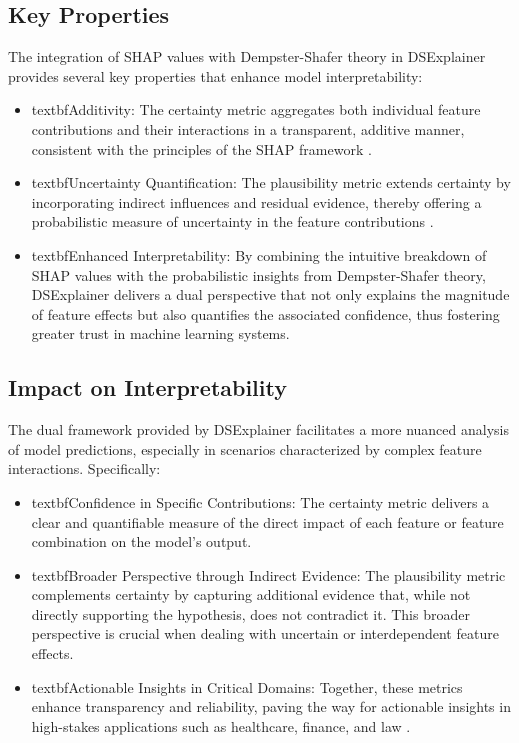 \documentclass[acmlarge]{acmart}
\begin{document}
\subsection{Key Properties}

The integration of SHAP values with Dempster-Shafer theory in DSExplainer provides several key properties that enhance model interpretability:

\begin{itemize}
    \item textbf{Additivity:} The certainty metric aggregates both individual feature contributions and their interactions in a transparent, additive manner, consistent with the principles of the SHAP framework \cite{shapley1953value}.
    \item textbf{Uncertainty Quantification:} The plausibility metric extends certainty by incorporating indirect influences and residual evidence, thereby offering a probabilistic measure of uncertainty in the feature contributions \cite{shafer1976mathematical}.
    \item textbf{Enhanced Interpretability:} By combining the intuitive breakdown of SHAP values with the probabilistic insights from Dempster-Shafer theory, DSExplainer delivers a dual perspective that not only explains the magnitude of feature effects but also quantifies the associated confidence, thus fostering greater trust in machine learning systems.
\end{itemize}

\subsection{Impact on Interpretability}

The dual framework provided by DSExplainer facilitates a more nuanced analysis of model predictions, especially in scenarios characterized by complex feature interactions. Specifically:

\begin{itemize}
    \item textbf{Confidence in Specific Contributions:} The certainty metric delivers a clear and quantifiable measure of the direct impact of each feature or feature combination on the model's output.
    \item textbf{Broader Perspective through Indirect Evidence:} The plausibility metric complements certainty by capturing additional evidence that, while not directly supporting the hypothesis, does not contradict it. This broader perspective is crucial when dealing with uncertain or interdependent feature effects.
    \item textbf{Actionable Insights in Critical Domains:} Together, these metrics enhance transparency and reliability, paving the way for actionable insights in high-stakes applications such as healthcare, finance, and law \cite{zhang2021evidential}.
\end{itemize}
\end{document}
